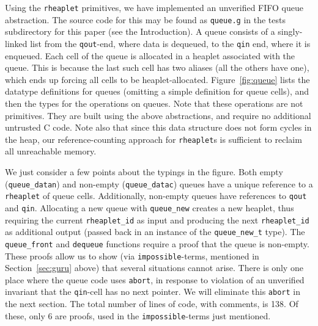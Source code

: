 \documentclass[9pt,natbib]{sigplanconf}
\begin{document}
Using the \texttt{rheaplet} primitives, we have implemented an
unverified FIFO queue abstraction.  The source code for this may be
found as \texttt{queue.g} in the tests subdirectory for this paper
(see the Introduction).  A queue consists of a singly-linked list from
the \texttt{qout}-end, where data is dequeued, to the \texttt{qin}
end, where it is enqueued.  Each cell of the queue is allocated in a
heaplet associated with the queue.  This is because the last such cell
has two aliases (all the others have one), which ends up forcing all
cells to be heaplet-allocated.  Figure~\ref{fig:queue} lists the
datatype definitions for queues (omitting a simple definition for
queue cells), and then the types for the operations on queues.  Note
that these operations are not primitives.  They are built using the
above abstractions, and require no additional untrusted C code.  Note
also that since this data structure does not form cycles in the heap,
our reference-counting approach for \texttt{rheaplet}s is sufficient
to reclaim all unreachable memory.

We just consider a few points about the typings in the figure.  Both
empty (\texttt{queue\_datan}) and non-empty (\texttt{queue\_datac})
queues have a unique reference to a \texttt{rheaplet} of queue cells.
Additionally, non-empty queues have references to \texttt{qout} and
\texttt{qin}.  Allocating a new queue with \texttt{queue\_new} creates
a new heaplet, thus requiring the current \texttt{rheaplet\_id} as
input and producing the next \texttt{rheaplet\_id} as additional
output (passed back in an instance of the \texttt{queue\_new\_t}
type).  The \texttt{queue\_front} and \texttt{dequeue} functions
require a proof that the queue is non-empty.  These proofs allow us to
show (via \texttt{impossible}-terms, mentioned in
Section~\ref{sec:guru} above) that several situations cannot arise.
There is only one place where the queue code uses \texttt{abort}, in
response to violation of an unverified invariant that the
\texttt{qin}-cell has no next pointer.  We will eliminate this
\texttt{abort} in the next section.  The total number of lines of
code, with comments, is 138.  Of these, only 6 are proofs, used in the
\texttt{impossible}-terms just mentioned.
\end{document}

